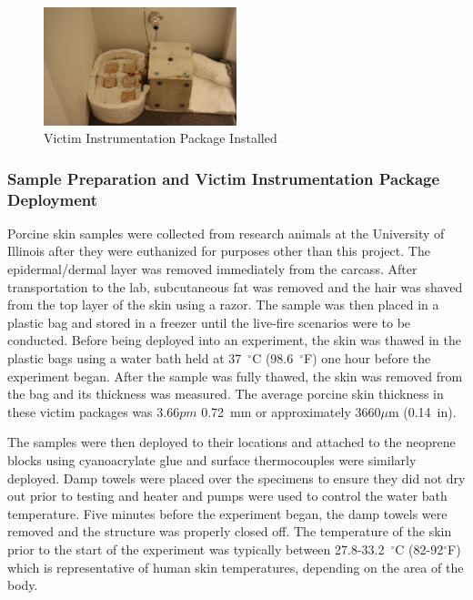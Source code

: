\documentclass[12pt,oneside]{book}
\begin{document}
\begin{figure}[H]
\centering
\includegraphics[width=0.5\textwidth]{../0_Images/Instrumentation/Burn_Measurements/SBA_Deployed}
\caption{Victim Instrumentation Package Installed}
\label{fig:inst_SBA_deployed}
\end{figure}

\subsubsection{Sample Preparation and Victim Instrumentation Package Deployment}
Porcine skin samples were collected from research animals at the University of Illinois after they were euthanized for purposes other than this project. The epidermal/dermal layer was removed immediately from the carcass.  After transportation to the lab, subcutaneous fat was removed and the hair was shaved from the top layer of the skin using a razor. The sample was then placed in a plastic bag and stored in a freezer until the live-fire scenarios were to be conducted. Before being deployed into an experiment, the skin was thawed in the plastic bags using a water bath held at 37~$^\circ$C (98.6~$^\circ$F) one hour before the experiment began. After the sample was fully thawed, the skin was removed from the bag and its thickness was measured. The average porcine skin thickness in these victim packages was 3.66$pm$ 0.72~mm or approximately 3660$\mu$m (0.14~in).  

The samples were then deployed to their locations and attached to the neoprene blocks using cyanoacrylate glue and surface thermocouples were similarly deployed. Damp towels were placed over the specimens to ensure they did not dry out prior to testing and heater and pumps were used to control the water bath temperature. Five minutes before the experiment began, the damp towels were removed and the structure was properly closed off. The temperature of the skin prior to the start of the experiment was typically between 27.8-33.2~$^\circ$C (82-92$^\circ$F) which is representative of human skin temperatures, depending on the area of the body.
\end{document}
